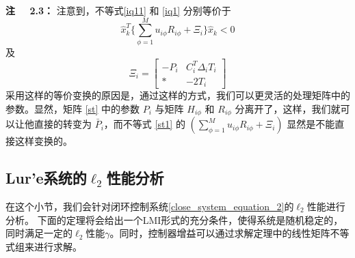 	{\bf 注 \ \ 2.3：} 
	注意到，不等式\eqref{iq11} 和 \eqref{iq1} 分别等价于
	\begin{equation}\label{st1}
	\hat{x}^{T}_{k}\{\sum_{\phi=1}^{M}u_{i\phi}R_{i\phi}+\varXi_{i} \}\hat{x}_{k}<0
	\end{equation}
	及
	\begin{equation*}
	\varXi_{i}=\begin{bmatrix}
	-P_{i}&C^{T}_{i}\varDelta_{i}T_{i}\\
	*&-2T_{i}
	\end{bmatrix}   
	\end{equation*}
	采用这样的等价变换的原因是，通过这样的方式，我们可以更灵活的处理矩阵中的参数。显然，矩阵 \eqref{st} 中的参数 $P_i$ 与矩阵 $H_{i\phi}$ 和 $R_{i\phi}$ 分离开了，这样，我们就可以让他直接的转变为 $\bar{P}_{i}$，而不等式 \eqref{st1} 的 $(\sum_{\phi=1}^{M}u_{i\phi}R_{i\phi}+\varXi_{i})$ 显然是不能直接这样变换的。

\subsection{Lur'e系统的$\ell_2$性能分析}
	在这个小节，我们会针对闭环控制系统\eqref{close_system_equation_2}的$\ell_2$性能进行分析。 下面的定理将会给出一个LMI形式的充分条件，使得系统是随机稳定的，同时满足一定的$\ell_2$性能$\gamma$。同时，控制器增益可以通过求解定理中的线性矩阵不等式组来进行求解。
	
